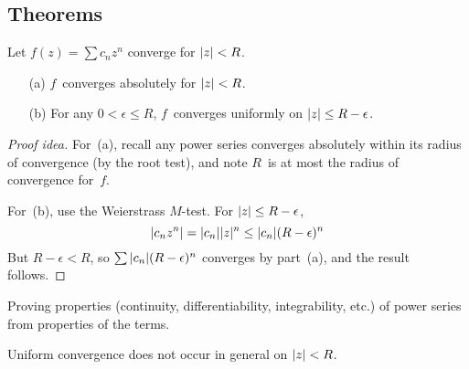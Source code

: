 \subsection*{Theorems}
\begin{thm}
Let \(f(z)=\sum c_n z^n\) converge for \(|{z}|<R\).
\begin{enumerate}[itemsep=0pt]
\item[(a)] \(f\)~converges absolutely for \(|{z}|<R\).
\item[(b)] For any \(0<\epsilon\le R\), \(f\)~converges uniformly on \(|{z}|\le R-\epsilon\).
\end{enumerate}
\end{thm}
\begin{proof}[Proof idea]
For~(a), recall any power series converges absolutely within its radius of convergence (by the root test), and note \(R\)~is at most the radius of convergence for~\(f\).

For~(b), use the Weierstrass \(M\)-test. For \(|{z}|\le R-\epsilon\),
\[|{c_nz^n}|=|{c_n}||{z}|^n\le|{c_n}|(R-\epsilon)^n\]
But \(R-\epsilon<R\), so \(\sum|{c_n}|(R-\epsilon)^n\) converges by part~(a), and the result follows.
\end{proof}
\begin{app}
Proving properties (continuity, differentiability, integrability, etc.) of power series from properties of the terms.
\end{app}
\begin{rmk}
Uniform convergence does not occur in general on \(|{z}|<R\).
\end{rmk}

